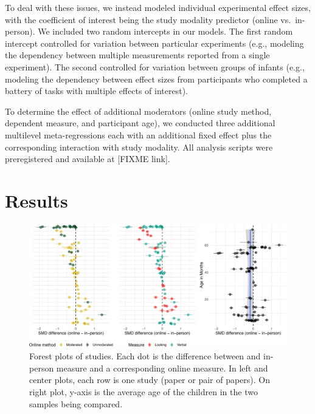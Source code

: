 \documentclass[
  man,floatsintext]{apa6}
\begin{document}
To deal with these issues, we instead modeled individual experimental effect sizes, with the coefficient of interest being the study modality predictor (online vs.~in-person). We included two random intercepts in our models. The first random intercept controlled for variation between particular experiments (e.g., modeling the dependency between multiple measurements reported from a single experiment). The second controlled for variation between groups of infants (e.g., modeling the dependency between effect sizes from participants who completed a battery of tasks with multiple effects of interest).

To determine the effect of additional moderators (online study method, dependent measure, and participant age), we conducted three additional multilevel meta-regressions each with an additional fixed effect plus the corresponding interaction with study modality. All analysis scripts were preregistered and available at {[}FIXME link{]}.

\hypertarget{results}{%
\section{Results}\label{results}}

\begin{figure}[h]

{\centering \includegraphics[width=1\linewidth]{OnlineMA_main_files/figure-latex/forest-1} 

}

\caption{Forest plots of studies. Each dot is the difference between and in-person measure and a corresponding online measure. In left and center plots, each row is one study (paper or pair of papers). On right plot, y-axis is the average age of the children in the two samples being compared.}\label{fig:forest}
\end{figure}
\end{document}
